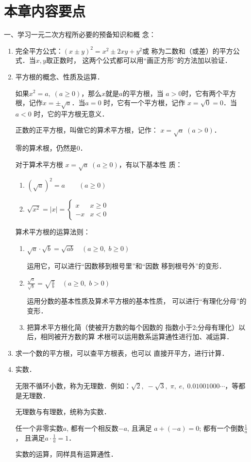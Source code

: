 \section*{本章内容要点}
一、学习一元二次方程所必要的预备知识和概
念：
\begin{enumerate}
    \item 完全平方公式：$(x\pm y)^2=x^2\pm 2xy+y^2$或
称为二数和（或差）的平方公式．当$x,y$取正数时，
这两个公式都可以用“画正方形”的方法加以验证．
\item 平方根的概念、性质及运算．

如果$x^2=a,\; (a\ge 0)$，那么$x$就是$a$的平方根，当
$a>0$时，它有两个平方根，记作$x=\pm\sqrt{a}$．当$a=0$
时，它有一个平方根，记作
$x=\sqrt{0}=0$．当$a<0$
时，它的平方根无意义．

正数的正平方根，叫做它的算术平方根，记作：
$x=\sqrt{a}\; (a>0)$．

零的算术根，仍然是0．

对于算术平方根
$x=\sqrt{a}\; (a\ge 0)$，有以下基本性
质：
\begin{enumerate}
    \item $(\sqrt{a})^2=a\qquad (a\ge 0)$
    \item $\sqrt{x^2}=|x|=\begin{cases}
        x& x\ge 0\\
        -x& x<0
    \end{cases}$
\end{enumerate}


算术平方根的运算法则：
\begin{enumerate}
    \item $\sqrt{a}\cdot \sqrt{b}=\sqrt{ab}\quad (a\ge 0,\; b\ge 0)$
    
    运用它，可以进行“因数移到根号里”和“因数
移到根号外”的变形．

\item $\frac{\sqrt{a}}{\sqrt{b}}=\sqrt{\frac{a}{b}}\quad (a\ge 0,\; b> 0)$

运用分数的基本性质及算术平方根的基本性质，
可以进行“有理化分母”的变形．

\item 把算术平方根化简（使被开方数的每个因数的
指数小于2;分母有理化）以后，相同被开方数的算
术根可以运用数系运算通性进行加、减运算．
\end{enumerate}

\item 求一个数的平方根，可以查平方根表，也可以
直接开平方，进行计算．
\item 实数．

无限不循环小数，称为无理数．例如：$\sqrt{2},\; -\sqrt{3},\; \pi,\; e,\; 0.01001000\cdots$，等都是无理数．

无理数与有理数，统称为实数．

任一个非零实数$a$, 都有一个相反数$-a$, 且满足
$a+(-a)=0$; 都有一个倒数$\frac{1}{a}$，
且满足$a\cdot \frac{1}{a}=1$．

实数的运算，同样具有运算通性．
\end{enumerate}

